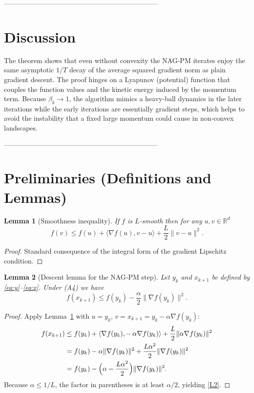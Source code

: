 \documentclass[11pt]{article}
\newtheorem{lemma}{Lemma}
\newcommand{\R}{\mathbb{R}}
\begin{document}
--------------------------------------------------------------------

\section*{Discussion}
The theorem shows that even without convexity the NAG‑PM iterates enjoy the same
asymptotic $1/T$ decay of the average squared gradient norm as plain gradient
descent.  The proof hinges on a Lyapunov (potential) function that couples the
function values and the kinetic energy induced by the momentum term.
Because $\beta_k\to1$, the algorithm mimics a heavy‑ball dynamics in the later
iterations while the early iterations are essentially gradient steps, which
helps to avoid the instability that a fixed large momentum could cause in
non‑convex landscapes.

--------------------------------------------------------------------

\section*{Preliminaries (Definitions and Lemmas)}
\begin{lemma}[Smoothness inequality]\label{lem:smooth}
If $f$ is $L$‑smooth then for any $u,v\in\R^{d}$
\[
f(v)\le f(u)+\langle\nabla f(u),v-u\rangle+\frac{L}{2}\|v-u\|^{2}.
\tag{L1}
\]
\end{lemma}
\begin{proof}
Standard consequence of the integral form of the gradient Lipschitz condition. \qedhere
\end{proof}

\begin{lemma}[Descent lemma for the NAG‑PM step]\label{lem:descent}
Let $y_k$ and $x_{k+1}$ be defined by \eqref{eq:y}–\eqref{eq:x}. Under (A4) we have
\[
f(x_{k+1})\le f(y_k)-\frac{\alpha}{2}\|\nabla f(y_k)\|^{2}.
\tag{L2}
\]
\end{lemma}
\begin{proof}
Apply Lemma~\ref{lem:smooth} with $u=y_k$, $v=x_{k+1}=y_k-\alpha\nabla f(y_k)$:
\[
\begin{aligned}
f(x_{k+1})
&\le f(y_k)+\langle\nabla f(y_k),-\,\alpha\nabla f(y_k)\rangle
   +\frac{L}{2}\|\alpha\nabla f(y_k)\|^{2}\\
&= f(y_k)-\alpha\|\nabla f(y_k)\|^{2}
   +\frac{L\alpha^{2}}{2}\|\nabla f(y_k)\|^{2}\\
&= f(y_k)-\Bigl(\alpha-\frac{L\alpha^{2}}{2}\Bigr)\|\nabla f(y_k)\|^{2}.
\end{aligned}
\]
Because $\alpha\le1/L$, the factor in parentheses is at least $\alpha/2$,
yielding \eqref{L2}. \qedhere
\end{proof}
\end{document}

